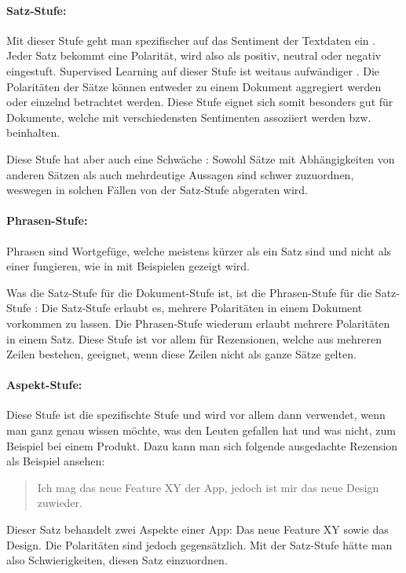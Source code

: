 \paragraph{Satz-Stufe:}

Mit dieser Stufe geht man spezifischer auf das Sentiment der Textdaten ein \cite[21572]{amjad2023sentiment}. Jeder Satz bekommt eine Polarität, wird also als positiv, neutral oder negativ eingestuft. Supervised Learning auf dieser Stufe ist weitaus aufwändiger \cite[5734]{Wankhade2022sentiment}. Die Polaritäten der Sätze können entweder zu einem Dokument aggregiert werden oder einzelnd betrachtet werden. Diese Stufe eignet sich somit besonders gut für Dokumente, welche mit verschiedensten Sentimenten assoziiert werden bzw. beinhalten.

Diese Stufe hat aber auch eine Schwäche \cite[5734-5735]{Wankhade2022sentiment}: Sowohl Sätze mit Abhängigkeiten von anderen Sätzen als auch mehrdeutige Aussagen sind schwer zuzuordnen, weswegen in solchen Fällen von der Satz-Stufe abgeraten wird. 

\paragraph{Phrasen-Stufe:}

Phrasen sind Wortgefüge, welche meistens kürzer als ein Satz sind und nicht als einer fungieren, wie in \cite[154]{Meibauer2003phrasen} mit Beispielen gezeigt wird.

Was die Satz-Stufe für die Dokument-Stufe ist, ist die Phrasen-Stufe für die Satz-Stufe \cite[5735]{Wankhade2022sentiment}: Die Satz-Stufe erlaubt es, mehrere Polaritäten in einem Dokument vorkommen zu lassen. Die Phrasen-Stufe wiederum erlaubt mehrere Polaritäten in einem Satz. Diese Stufe ist vor allem für Rezensionen, welche aus mehreren Zeilen bestehen, geeignet, wenn diese Zeilen nicht als ganze Sätze gelten.

\paragraph{Aspekt-Stufe:}

Diese Stufe ist die spezifischte Stufe \cite[21572]{amjad2023sentiment} und wird vor allem dann verwendet, wenn man ganz genau wissen möchte, was den Leuten gefallen hat und was nicht, zum Beispiel bei einem Produkt. Dazu kann man sich folgende ausgedachte Rezension als Beispiel ansehen:
\begin{quote}
    Ich mag das neue Feature XY der App, jedoch ist mir das neue Design zuwieder.
\end{quote}
Dieser Satz behandelt zwei Aspekte einer App: Das neue Feature XY sowie das Design. Die Polaritäten sind jedoch gegensätzlich. Mit der Satz-Stufe hätte man also Schwierigkeiten, diesen Satz einzuordnen.

